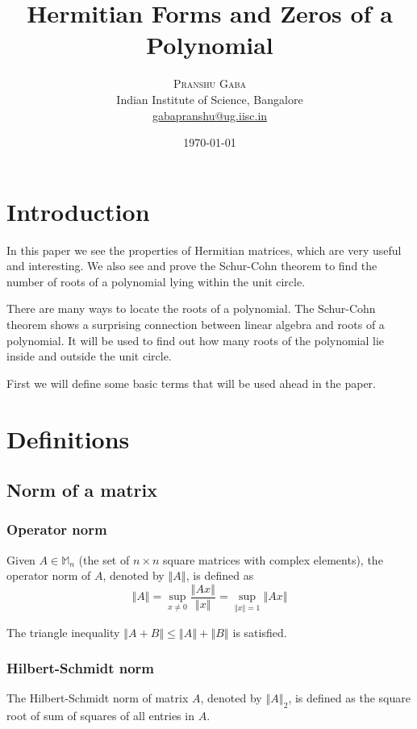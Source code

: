 \documentclass[twofold]{article}
\author{%
\textsc{Pranshu Gaba}  \\[1ex]
\normalsize Indian Institute of Science, Bangalore \\
\normalsize \href{mailto:gabapranshu@iisc.ac.in}{gabapranshu@ug.iisc.in}}
\title{Hermitian Forms and Zeros of a Polynomial}
\date{\today}
\newcommand*\norm[1]{\left \Vert #1 \right\Vert}
\theoremstyle{plain}
\theoremstyle{definition}
\theoremstyle{remark}
\begin{document}
\maketitle

\section{Introduction}


In this paper we see the properties of Hermitian matrices, which are very useful and interesting. We also see and prove the Schur-Cohn theorem to find the number of roots of a polynomial lying within the unit circle. 

There are many ways to locate the roots of a polynomial. The Schur-Cohn theorem shows a surprising connection between linear algebra and roots of a polynomial. It will be used to find out how many roots of the polynomial lie inside and outside the unit circle.

First we will define some basic terms that will be used ahead in the paper.

\section{Definitions}



\subsection{Norm of a matrix}

\subsubsection{Operator norm}
Given \(A \in \mathbb{M}_n\) (the set of \(n \times n\) square matrices with complex elements), the operator norm of \(A\), denoted by \(\norm{A}\), is defined as \[\norm{A} =\displaystyle \sup _{x \neq 0} \frac{\norm{Ax}}{\norm{x}} = \sup_{\norm{x} = 1} \norm{Ax} \]

 The triangle inequality \(\norm{A + B} \leq \norm{A} + \norm{B}\) is satisfied. 

\subsubsection{Hilbert-Schmidt norm}

The Hilbert-Schmidt norm of matrix \(A\), denoted by \(\norm{A}_2\),  is defined as the square root of sum of squares of all entries in \(A\). 
\end{document}
